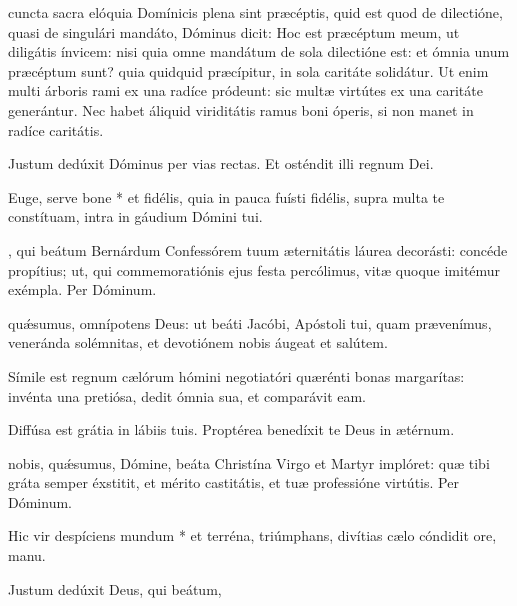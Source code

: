 \documentclass[fontsize=9pt,paper=A6,twoside,BCOR=1mm,DIV=22,headinclude]{scrarticle}
\renewcommand\A{\Ant}
\begin{document}
\begin{multicols}{2}
 cuncta sacra elóquia Domínicis plena sint præcéptis, quid est quod de dilectióne, quasi de singulári mandáto, Dóminus dicit: Hoc est præcéptum meum, ut diligátis ínvicem: nisi quia omne mandátum de sola dilectióne est: et ómnia unum præcéptum sunt? quia quidquid præcípitur, in sola caritáte solidátur. Ut enim multi árboris rami ex una radíce pródeunt: sic multæ virtútes ex una caritáte generántur. Nec habet áliquid viriditátis ramus boni óperis, si non manet in radíce caritátis.

\Te


\V Justum dedúxit Dóminus per vias rectas.
\R Et osténdit illi regnum Dei.

 Euge, serve bone * et fidélis, quia in pauca fuísti fidélis, supra multa te constítuam, intra in gáudium Dómini tui.

, qui beátum Bernárdum Confessórem tuum æternitátis láurea decorásti: concéde propítius; ut, qui commemoratiónis ejus festa percólimus, vitæ quoque imitémur exémpla. Per Dóminum.



 qu\'æsumus, omnípotens Deus: ut beáti Jacóbi, Apóstoli tui, quam prævenímus, veneránda solémnitas, et devotiónem nobis áugeat et salútem.


\A Símile est regnum cælórum hómini negotiatóri quærénti bonas margarítas: invénta una pretiósa, dedit ómnia sua, et comparávit eam.

\V Diffúsa est grátia in lábiis tuis.
\R Proptérea benedíxit te Deus in ætérnum.

 nobis, quǽsumus, Dómine, beáta Christína Virgo et Martyr implóret: quæ tibi gráta semper éxstitit, et mérito castitátis, et tuæ professióne virtútis. Per Dóminum.


 Hic vir despíciens mundum * et terréna, triúmphans, divítias cælo cóndidit ore, manu.

\V Justum dedúxit  Deus, qui beátum, 





\end{multicols}
\end{document}
